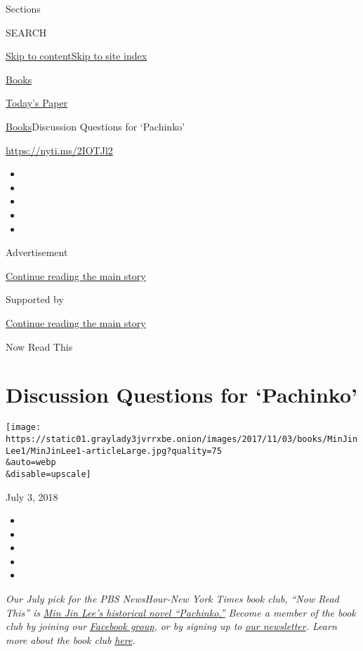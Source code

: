 Sections

SEARCH

\protect\hyperlink{site-content}{Skip to
content}\protect\hyperlink{site-index}{Skip to site index}

\href{https://www.nytimes3xbfgragh.onion/section/books}{Books}

\href{https://myaccount.nytimes3xbfgragh.onion/auth/login?response_type=cookie\&client_id=vi}{}

\href{https://www.nytimes3xbfgragh.onion/section/todayspaper}{Today's
Paper}

\href{/section/books}{Books}\textbar{}Discussion Questions for
`Pachinko'

\url{https://nyti.ms/2IOTJl2}

\begin{itemize}
\item
\item
\item
\item
\item
\end{itemize}

Advertisement

\protect\hyperlink{after-top}{Continue reading the main story}

Supported by

\protect\hyperlink{after-sponsor}{Continue reading the main story}

Now Read This

\hypertarget{discussion-questions-for-pachinko}{%
\section{Discussion Questions for
`Pachinko'}\label{discussion-questions-for-pachinko}}

\texttt{[image: https://static01.graylady3jvrrxbe.onion/images/2017/11/03/books/MinJinLee1/MinJinLee1-articleLarge.jpg?quality=75\\\&auto=webp\\\&disable=upscale]}

July 3, 2018

\begin{itemize}
\item
\item
\item
\item
\item
\end{itemize}

\emph{Our July pick for the PBS NewsHour-New York Times book club, ``Now
Read This'' is}
\href{https://www.nytimes3xbfgragh.onion/2017/02/02/books/review/pachinko-min-jin-lee.html?rref=collection\%2Fspotlightcollection\%2Fnow-read-this\&action=click\&contentCollection=books\&region=rank\&module=package\&version=highlights\&contentPlacement=2\&pgtype=collection}{\emph{Min
Jin Lee's historical novel ``Pachinko.''}} \emph{Become a member of the
book club by joining our}
\href{https://www.facebookcorewwwi.onion/groups/NowReadThisBookClub}{\emph{Facebook
group}}\emph{, or by signing up to}
\href{https://pbs.us1.list-manage.com/subscribe?u=8aa1c620fd96b27384151c36e\&id=2fe6581b35}{\emph{our
newsletter}}\emph{. Learn more about the book club}
\href{https://www.pbs.org/newshour/arts/what-is-now-read-this}{\emph{here}}\emph{.}


